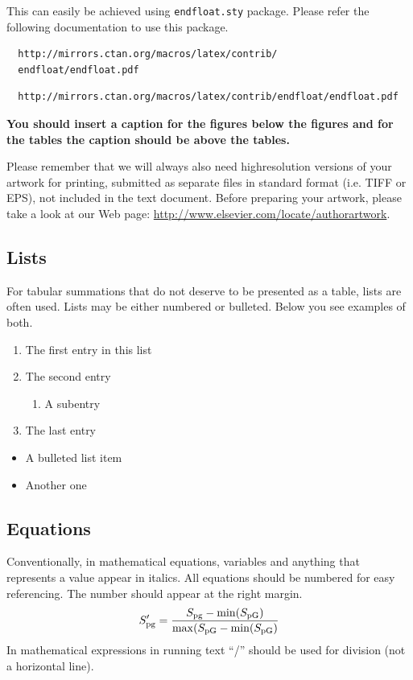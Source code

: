 \documentclass[times,referee,twocolumn,final,authoryear]{elsarticle}
\begin{document}
This can easily be achieved using \verb+endfloat.sty+ package. Please
refer the following documentation to use this package.
\makeatletter
\if@twocolumn
\begin{verbatim}
  http://mirrors.ctan.org/macros/latex/contrib/
  endfloat/endfloat.pdf
\end{verbatim}
\else
\begin{verbatim}
  http://mirrors.ctan.org/macros/latex/contrib/endfloat/endfloat.pdf
\end{verbatim}
\fi
\makeatother

\textcolor{newcolor}{\bf You should insert a caption for the figures
below the figures and for the tables the caption should be above the
tables.} 

Please remember that we will always also need highresolution versions
of your artwork for printing, submitted as separate files in standard
format (i.e. TIFF or EPS), not included in the text document. Before
preparing your artwork, please take a look at our Web page:
\url{http://www.elsevier.com/locate/authorartwork}.


\subsection{Lists}

For tabular summations that do not deserve to be presented as
a table, lists are often used. Lists may be either numbered or
bulleted. Below you see examples of both.
\begin{enumerate}
\item The first entry in this list
\item The second entry
\begin{enumerate}
\item A subentry
\end{enumerate}
\item The last entry
\end{enumerate}
\begin{itemize}
\item A bulleted list item
\item Another one
\end{itemize}

\subsection{Equations}
Conventionally, in mathematical equations, variables and
anything that represents a value appear in italics.
All equations should be numbered for easy referencing. The number
should appear at the right margin.
\begin{equation}
S_{\rm pg}'=\frac{S_{\rm pg}-\min(S_{\rm pG})}
 {\max(S_{\rm pG}-\min(S_{\rm pG})}
\end{equation}
In mathematical expressions in running text ``/'' should be used for
division (not a horizontal line). 
\end{document}

